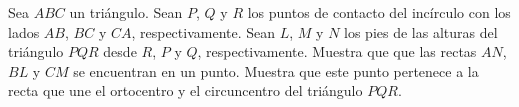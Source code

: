 Sea $ABC$ un triángulo. Sean $P$, $Q$ y $R$ los puntos de contacto del incírculo con los lados $AB$, $BC$ y $CA$, respectivamente. Sean $L$, $M$ y $N$ los pies de las alturas del triángulo $PQR$ desde $R$, $P$ y $Q$, respectivamente. Muestra que que las rectas $AN$, $BL$ y $CM$ se encuentran en un punto. Muestra que este punto pertenece a la recta que une el ortocentro y el circuncentro del triángulo $PQR$.